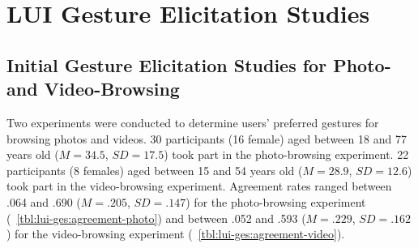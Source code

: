 \chapter{LUI Gesture Elicitation Studies} \label{app:lui-ges}


\section{Initial Gesture Elicitation Studies for Photo- and Video-Browsing}
\label{app:lui-ges:initial}
Two experiments were conducted to determine users' preferred gestures for browsing photos and videos. 30 participants (16 female) aged between 18 and 77 years old ($M{=}34.5$, $SD{=}17.5$) took part in the photo-browsing experiment. 22 participants (8 females) aged between 15 and 54 years old ($M{=}28.9$, $SD{=}12.6$) took part in the video-browsing experiment. Agreement rates ranged between .064 and .690 ($M{=}.205$, $SD{=}.147$) for the photo-browsing experiment (\tab~\ref{tbl:lui-ges:agreement-photo}) and between .052 and .593 ($M{=}.229$, $SD{=}.162$) for the video-browsing experiment (\tab~\ref{tbl:lui-ges:agreement-video}).

